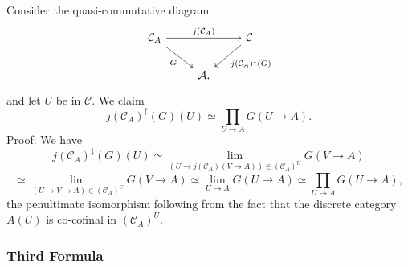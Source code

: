 \documentclass[12pt]{article}%
\theoremstyle{remark}
\theoremstyle{definition}
\newcommand{\A}{\mathcal A}
\newcommand{\C}{\mathcal C}
\begin{document}
Consider the quasi-commutative diagram 
$$
\begin{tikzcd}
\C_A\ar{rr}{j(\C_A)}\ar{dr}[swap]{G}&&\C\ar{dl}{j(\C_A)^\ddagger(G)}\\ 
{}&\A,
\end{tikzcd}
$$ 
and let $U$ be in $\C$. We claim 
\begin{equation}\label{prepa2}
j(\C_A)^\ddagger(G)(U)\simeq\prod_{U\to A}G(U\to A).
\end{equation} 
Proof: We have 
$$
j(\C_A)^\ddagger(G)(U)\simeq\lim_{(U\to j(\C_A)(V\to A))\in(\C_A)^U}G(V\to A)
$$
$$
\simeq\lim_{(U\to V\to A)\in(\C_A)^U}G(V\to A)\simeq\lim_{U\to A}G(U\to A)\simeq\prod_{U\to A}G(U\to A),
$$
the penultimate isomorphism following from the fact that the discrete category $A(U)$ is co-cofinal in $(\C_A)^U$. 

\subsubsection{Third Formula}
\end{document}
